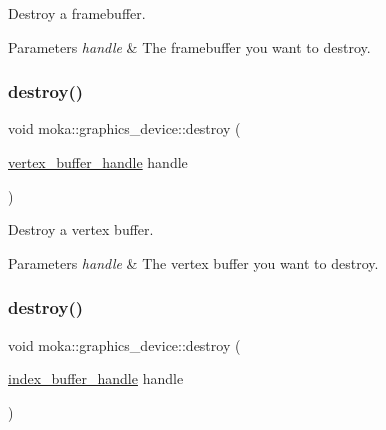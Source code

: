 Destroy a framebuffer. 


\begin{DoxyParams}{Parameters}
{\em handle} & The framebuffer you want to destroy. \\
\hline
\end{DoxyParams}
\mbox{\label{classmoka_1_1graphics__device_a3a84773dbbbda657b945d76124af601a}} 
\subsubsection{\texorpdfstring{destroy()}{destroy()}\hspace{0.1cm}{\footnotesize\ttfamily [4/5]}}
{\footnotesize\ttfamily void moka\+::graphics\+\_\+device\+::destroy (\begin{DoxyParamCaption}\item[{\mbox{\hyperlink{structmoka_1_1vertex__buffer__handle}{vertex\+\_\+buffer\+\_\+handle}}}]{handle }\end{DoxyParamCaption})}



Destroy a vertex buffer. 


\begin{DoxyParams}{Parameters}
{\em handle} & The vertex buffer you want to destroy. \\
\hline
\end{DoxyParams}
\mbox{\label{classmoka_1_1graphics__device_ac79d12dc480e92575faded59818049cd}} 
\subsubsection{\texorpdfstring{destroy()}{destroy()}\hspace{0.1cm}{\footnotesize\ttfamily [5/5]}}
{\footnotesize\ttfamily void moka\+::graphics\+\_\+device\+::destroy (\begin{DoxyParamCaption}\item[{\mbox{\hyperlink{structmoka_1_1index__buffer__handle}{index\+\_\+buffer\+\_\+handle}}}]{handle }\end{DoxyParamCaption})}




